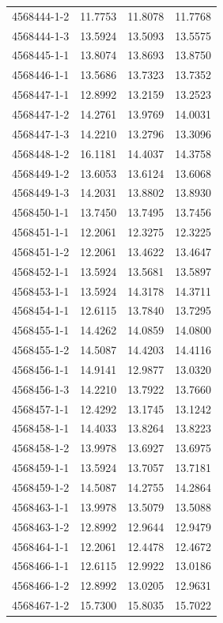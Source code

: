 \begin{longtable}{lrrr}
4568444-1-2 & 11.7753 & 11.8078 & 11.7768 \\
4568444-1-3 & 13.5924 & 13.5093 & 13.5575 \\
4568445-1-1 & 13.8074 & 13.8693 & 13.8750 \\
4568446-1-1 & 13.5686 & 13.7323 & 13.7352 \\
4568447-1-1 & 12.8992 & 13.2159 & 13.2523 \\
4568447-1-2 & 14.2761 & 13.9769 & 14.0031 \\
4568447-1-3 & 14.2210 & 13.2796 & 13.3096 \\
4568448-1-2 & 16.1181 & 14.4037 & 14.3758 \\
4568449-1-2 & 13.6053 & 13.6124 & 13.6068 \\
4568449-1-3 & 14.2031 & 13.8802 & 13.8930 \\
4568450-1-1 & 13.7450 & 13.7495 & 13.7456 \\
4568451-1-1 & 12.2061 & 12.3275 & 12.3225 \\
4568451-1-2 & 12.2061 & 13.4622 & 13.4647 \\
4568452-1-1 & 13.5924 & 13.5681 & 13.5897 \\
4568453-1-1 & 13.5924 & 14.3178 & 14.3711 \\
4568454-1-1 & 12.6115 & 13.7840 & 13.7295 \\
4568455-1-1 & 14.4262 & 14.0859 & 14.0800 \\
4568455-1-2 & 14.5087 & 14.4203 & 14.4116 \\
4568456-1-1 & 14.9141 & 12.9877 & 13.0320 \\
4568456-1-3 & 14.2210 & 13.7922 & 13.7660 \\
4568457-1-1 & 12.4292 & 13.1745 & 13.1242 \\
4568458-1-1 & 14.4033 & 13.8264 & 13.8223 \\
4568458-1-2 & 13.9978 & 13.6927 & 13.6975 \\
4568459-1-1 & 13.5924 & 13.7057 & 13.7181 \\
4568459-1-2 & 14.5087 & 14.2755 & 14.2864 \\
4568463-1-1 & 13.9978 & 13.5079 & 13.5088 \\
4568463-1-2 & 12.8992 & 12.9644 & 12.9479 \\
4568464-1-1 & 12.2061 & 12.4478 & 12.4672 \\
4568466-1-1 & 12.6115 & 12.9922 & 13.0186 \\
4568466-1-2 & 12.8992 & 13.0205 & 12.9631 \\
4568467-1-2 & 15.7300 & 15.8035 & 15.7022 \\

\end{longtable}
